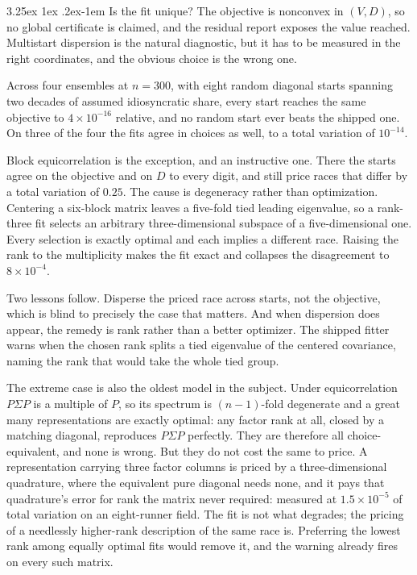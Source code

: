 \documentclass[11pt]{article}
\makeatletter
\renewcommand\paragraph{\@startsection{paragraph}{4}{\z@}%
  {3.25ex \@plus1ex \@minus.2ex}{-1em}%
  {\normalfont\normalsize\itshape}}
\makeatother
\begin{document}
\paragraph{Is the fit unique?} The objective is nonconvex in $(V,D)$, so
no global certificate is claimed, and the residual report exposes the
value reached. Multistart dispersion is the natural diagnostic, but it
has to be measured in the right coordinates, and the obvious choice is
the wrong one.

Across four ensembles at $n=300$, with eight random diagonal starts
spanning two decades of assumed idiosyncratic share, every start reaches
the same objective to $4\times10^{-16}$ relative, and no random start
ever beats the shipped one. On three of the four the fits agree in
choices as well, to a total variation of $10^{-14}$.

Block equicorrelation is the exception, and an instructive one. There the
starts agree on the objective and on $D$ to every digit, and still price
races that differ by a total variation of $0.25$. The cause is degeneracy
rather than optimization. Centering a six-block matrix leaves a five-fold
tied leading eigenvalue, so a rank-three fit selects an arbitrary
three-dimensional subspace of a five-dimensional one. Every selection is
exactly optimal and each implies a different race. Raising the rank to
the multiplicity makes the fit exact and collapses the disagreement to
$8\times10^{-4}$.

Two lessons follow. Disperse the priced race across starts, not the
objective, which is blind to precisely the case that matters. And when
dispersion does appear, the remedy is rank rather than a better
optimizer. The shipped fitter warns when the chosen rank splits a tied
eigenvalue of the centered covariance, naming the rank that would take
the whole tied group.

The extreme case is also the oldest model in the subject. Under equicorrelation $P\Sigma P$ is a multiple of $P$, so its
spectrum is $(n-1)$-fold degenerate and a great many representations are
exactly optimal: any factor rank at all, closed by a matching diagonal,
reproduces $P\Sigma P$ perfectly. They are therefore all
choice-equivalent, and none is wrong. But they do not cost the same to
price. A representation carrying three factor columns is priced by a
three-dimensional quadrature, where the equivalent pure diagonal needs
none, and it pays that quadrature's error for rank the matrix never
required: measured at $1.5\times10^{-5}$ of total variation on an
eight-runner field. The fit is not what degrades; the pricing of a
needlessly higher-rank description of the same race is. Preferring the
lowest rank among equally optimal fits would remove it, and the warning
already fires on every such matrix.
\end{document}
